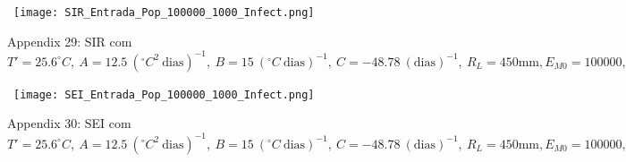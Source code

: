 \documentclass[
	12pt,				%
	oneside,			%
	a4paper,			%
	english,			%
	brazil				%
	]{abntex2}
\begin{document}
\begin{apendicesenv}
\begin{figure}[!ht]
\end{figure} 
\newpage
\begin{figure}[!ht]
	\centering
	\hbox{\hspace{2.7em} \texttt{[image: SIR\_Entrada\_Pop\_100000\_1000\_Infect.png]}}
	\caption*{Appendix 29: SIR com $T'=25.6^\circ C, \ A=12.5 \ (^\circ C^2 \ \text{dias})^{-1}, \ B=15 \ (^\circ C \ \text{dias})^{-1}, \ C=-48.78 \ (\text{dias})^{-1}, \ R_L=450 \text{mm}, E_{M0}=100000, I_{H0}=1000$} 
\end{figure} 
\begin{figure}[!ht]
	\centering
	\hbox{\hspace{2.5em} \texttt{[image: SEI\_Entrada\_Pop\_100000\_1000\_Infect.png]}}
	\caption*{Appendix 30: SEI com $T'=25.6^\circ C, \ A=12.5 \ (^\circ C^2 \ \text{dias})^{-1}, \ B=15 \ (^\circ C \ \text{dias})^{-1}, \ C=-48.78 \ (\text{dias})^{-1}, \ R_L=450 \text{mm}, E_{M0}=100000, I_{H0}=1000$} 
\end{figure} 

\end{apendicesenv}




\printindex
\end{document}
